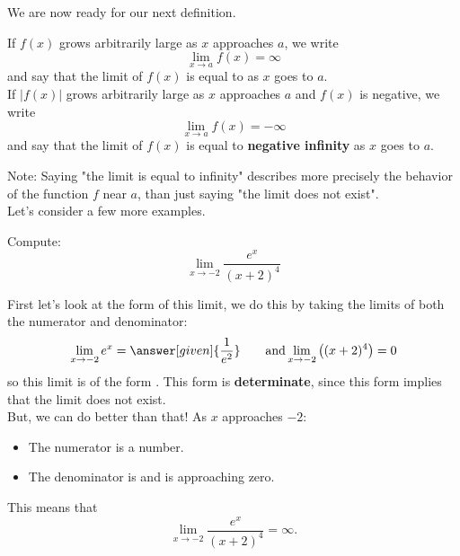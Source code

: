 \documentclass{ximera}
\begin{document}
We are now ready for our next definition.

\begin{definition}
If $f(x)$ grows arbitrarily large as $x$ approaches $a$, we write
\[
\lim_{x\to a} f(x) = \infty
\]
and say that the limit of $f(x)$ is equal to  as $x$
goes to $a$.\\

If $|f(x)|$ grows arbitrarily large as $x$ approaches $a$ and $f(x)$ is
negative, we write
\[
\lim_{x\to a} f(x) = -\infty
\]
and say that the limit of $f(x)$ is equal to \textbf{ negative infinity}
as $x$ goes to $a$.

\end{definition}

Note: Saying "the limit is equal to infinity"  describes more precisely the behavior of the function $f$ near $a$, than just saying "the limit does not exist".\\

Let's consider a few more examples.

\begin{example}
  Compute:
  \[
  \lim_{x\to -2} \frac{e^x}{(x+2)^4}
  \]
  \begin{explanation}
    First let's look at the form of this limit, we do this by taking the limits of both the numerator and denominator:
    \[
    \lim_{x\to -2} e^x = \answer[given]{\frac{1}{e^2}}\qquad\text{and}\lim_{x\to-2}\left((x+2)^4\right) = 0
    \]
    so this limit is of the form \numOverZero. This form is \textbf{determinate}, since this form implies that  the limit does not exist.\\
    But, we can do better than that!
     As $x$ approaches $-2$:
    \begin{itemize}
    \item The numerator is a  number. 
    \item The denominator is  and is approaching zero.
    \end{itemize}
    This means that
    \[
    \lim_{x\to -2} \frac{e^x}{(x+2)^4} = \infty.
    \]
  \end{explanation}
\end{example}
\end{document}
